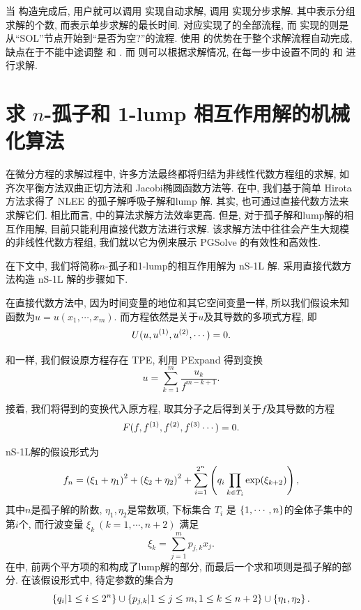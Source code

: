 当  构造完成后, 用户就可以调用  实现自动求解, 调用  实现分步求解. 其中表示分组求解的个数, 而表示单步求解的最长时间.   对应实现了的全部流程, 而  实现的则是从``SOL''节点开始到``是否为空?''的流程. 使用  的优势在于整个求解流程自动完成, 缺点在于不能中途调整  和 . 而  则可以根据求解情况, 在每一步中设置不同的  和  进行求解. 

\section{求 $n$-孤子和 1-lump 相互作用解的机械化算法}
在微分方程的求解过程中, 许多方法最终都将归结为非线性代数方程组的求解, 如齐次平衡方法\D 双曲正切方法和 Jacobi椭圆函数方法等. 在中, 我们基于简单 Hirota 方法求得了 NLEE 的孤子解\D 呼吸子解和lump 解. 其实, 也可通过直接代数方法来求解它们. 相比而言, 中的算法求解方法效率更高. 但是, 对于孤子解和lump解的相互作用解, 目前只能利用直接代数方法进行求解. 该求解方法中往往会产生大规模的非线性代数方程组, 我们就以它为例来展示 PGSolve 的有效性和高效性. 

在下文中, 我们将简称$n$-孤子和1-lump的相互作用解为 nS-1L 解. 采用直接代数方法构造 nS-1L 解的步骤如下. 

在直接代数方法中, 因为时间变量的地位和其它空间变量一样, 所以我们假设未知函数为$u=u(x_1,\cdots,x_m)$. 而方程依然是关于$u$及其导数的多项式方程, 即
\begin{equation}
    U(u,u^{(1)},u^{(2)},\cdots)=0 .
\end{equation}

和一样, 我们假设原方程存在 TPE, 利用 PExpand 得到变换
\begin{equation}
    u=\sum_{k=1}^m{\frac{u_k}{f^{m-k+1}}} .
\end{equation}

接着, 我们将得到的变换代入原方程, 取其分子之后得到关于$f$及其导数的方程
\begin{equation}
    F(f,f^{(1)},f^{(2)},f^{(3)}\cdots)=0 . \label{feq-ns1l}
\end{equation}

nS-1L解的假设形式为  
\begin{equation}
f_n=\left(\xi_1+\eta_1\right)^2+\left(\xi_2+\eta_2\right)^2+\sum_{i=1}^{2^n}\left(q_i\prod_{k \in T_i}{\exp(\xi_{k+2})}\right), \label{f-ns1l}
\end{equation}
其中$n$是孤子解的阶数, $\eta_1,\eta_2$是常数项, 下标集合 $T_i$ 是 $\left\{1,\cdots,n\right\}$的全体子集中的第$i$个, 而行波变量 $\xi_k~(k=1,\cdots,n+2)$ 满足
\begin{equation}
\xi_k=\sum_{j=1}^m{p_{j,k}x_j}.
\end{equation}
在中, 前两个平方项的和构成了lump解的部分, 而最后一个求和项则是孤子解的部分. 在该假设形式中, 待定参数的集合为
\begin{equation}
    \left\{q_i|1\le i \le 2^n\right\} \cup \left\{p_{j,k}|1\le j \le m, 1\le k \le n+2\right\} \cup \left\{\eta_1,\eta_2\right\}. \label{vrs-ns1l}
\end{equation}

